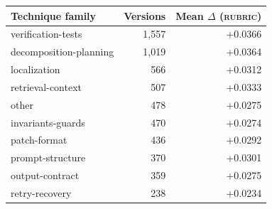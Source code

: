 \begin{tabular}{lrr}
\toprule
Technique family & Versions & Mean $\Delta$ (\textsc{rubric}) \\
\midrule
verification-tests & 1,557 & +0.0366 \\
decomposition-planning & 1,019 & +0.0364 \\
localization & 566 & +0.0312 \\
retrieval-context & 507 & +0.0333 \\
other & 478 & +0.0275 \\
invariants-guards & 470 & +0.0274 \\
patch-format & 436 & +0.0292 \\
prompt-structure & 370 & +0.0301 \\
output-contract & 359 & +0.0275 \\
retry-recovery & 238 & +0.0234 \\
\bottomrule
\end{tabular}
